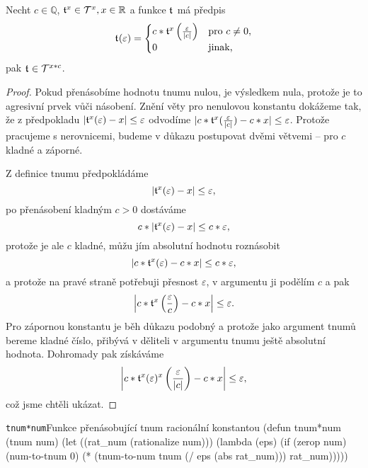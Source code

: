 \begin{theorem}
Necht $c\in\mathbb{Q}$, $\mathfrak{t}^{x}\in\mathcal{T}^{x},x\in\mathbb{R}$ a funkce $\mathfrak{t}^{}$ má předpis
\begin{equation}
\mathfrak{t}^{}(\varepsilon)=\begin{cases}c*\mathfrak{t}^{x}\left(\frac{\varepsilon}{|c|}\right) & \text{pro~}c\not = 0,\\0&\text{jinak,}\end{cases}
\end{equation}
pak $\mathfrak{t}^{}\in\mathcal{T}^{x*c}$.
\begin{proof}
Pokud přenásobíme hodnotu tnumu nulou, je výsledkem nula, protože je to agresivní prvek vůči násobení. Znění věty pro nenulovou konstantu dokážeme tak, že z předpokladu $|\mathfrak{t}^{x}(\varepsilon) -x|\leq\varepsilon$ odvodíme $|c*\mathfrak{t}^{x}(\frac{\varepsilon}{|c|})-c*x|\leq\varepsilon$. Protože pracujeme s nerovnicemi, budeme v důkazu postupovat dvěmi větvemi -- pro $c$ kladné a záporné.

Z definice tnumu předpokládáme
\begin{equation}
|\mathfrak{t}^{x}(\varepsilon)-x|\leq\varepsilon,
\end{equation}
po přenásobení kladným $c>0$ dostáváme
\begin{equation}
c*|\mathfrak{t}^{x}(\varepsilon)-x|\leq c*\varepsilon,
\end{equation}
protože je ale $c$ kladné, můžu jím absolutní hodnotu roznásobit
\begin{equation}
|c*\mathfrak{t}^{x}(\varepsilon)-c*x|\leq c*\varepsilon,
\end{equation}
a protože na pravé straně potřebuji přesnost $\varepsilon$, v argumentu ji podělím $c$ a pak
\begin{equation}
\left|c*\mathfrak{t}^{x}\left(\frac{\varepsilon}{c}\right)-c*x\right|\leq \varepsilon.
\end{equation}
Pro zápornou konstantu je běh důkazu podobný a protože jako argument tnumů bereme kladné číslo, přibývá v děliteli v argumentu tnumu ještě absolutní hodnota. Dohromady pak získáváme
\begin{equation}
\left|c*\mathfrak{t}^{x}(\varepsilon)^{x}\left(\frac{\varepsilon}{|c|}\right)-c*x\right|\leq\varepsilon,
\end{equation}
což jsme chtěli ukázat.
\end{proof}
\end{theorem}

\begin{lispcode}{\texttt{tnum*num}}{Funkce přenásobující tnum racionální konstantou}
(\textcolor{funkcionalni}{defun} \textcolor{pojmenovan}{tnum*num} (tnum num)
  (\textcolor{vedlejsi}{let} ((rat_num (\textcolor{matematicke}{rationalize} num)))
    (\textcolor{funkcionalni}{lambda} (eps)
      (\textcolor{funkcionalni}{if} (\textcolor{funkcionalni}{zerop} num)
        (\textcolor{moje}{num-to-tnum} 0)
        (\textcolor{matematicke}{*} (\textcolor{moje}{tnum-to-num} tnum (\textcolor{matematicke}{/} eps (\textcolor{matematicke}{abs} rat_num))) rat_num)))))
\end{lispcode}

